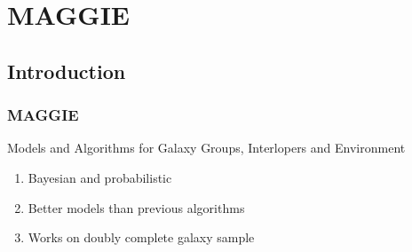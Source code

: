 \section{MAGGIE}

\subsection{Introduction}
\begin{frame}
    \frametitle{MAGGIE}
    \begin{block}{Models and Algorithms for Galaxy Groups, Interlopers
        and Environment}
        \begin{enumerate}
            \item<1-> Bayesian and probabilistic
            \item<2-> Better models than previous algorithms
            \item<3-> Works on doubly complete galaxy sample
        \end{enumerate}
    \end{block}
\end{frame}

